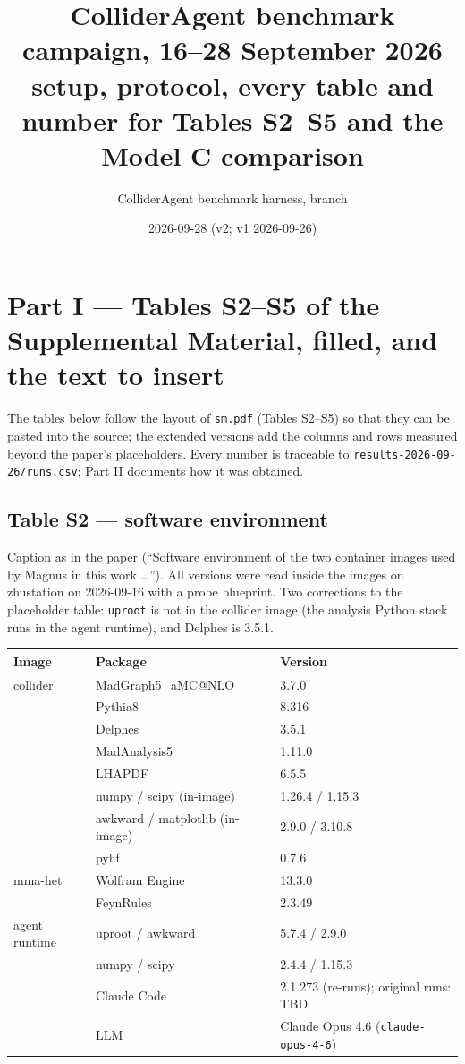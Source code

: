 \documentclass[10pt,a4paper]{article}
\title{ColliderAgent benchmark campaign, 16--28 September 2026\\\large setup, protocol, every table and number for Tables S2--S5 and the Model C comparison}
\author{ColliderAgent benchmark harness, branch \code{feat/skill-evolution-v2}}
\date{2026-09-28 (v2; v1 2026-09-26)}
\newcommand{\code}[1]{\texttt{#1}}
\begin{document}
\maketitle

\section*{Part I --- Tables S2--S5 of the Supplemental Material, filled, and the text to insert}
The tables below follow the layout of \code{sm.pdf} (Tables S2--S5) so that they can be pasted into the source; the extended
versions add the columns and rows measured beyond the paper's placeholders. Every number is traceable to
\code{results-2026-09-26/runs.csv}; Part II documents how it was obtained.

\subsection*{Table S2 --- software environment}
Caption as in the paper (``Software environment of the two container images used by Magnus in this work \ldots''). All
versions were read inside the images on zhustation on 2026-09-16 with a probe blueprint. Two corrections to the placeholder
table: \code{uproot} is not in the collider image (the analysis Python stack runs in the agent runtime), and Delphes is 3.5.1.
\begin{center}\small
\begin{tabular}{lll}
\toprule
Image & Package & Version \\
\midrule
collider & MadGraph5\_aMC@NLO & 3.7.0 \\
 & Pythia8 & 8.316 \\
 & Delphes & 3.5.1 \\
 & MadAnalysis5 & 1.11.0 \\
 & LHAPDF & 6.5.5 \\
 & numpy / scipy (in-image) & 1.26.4 / 1.15.3 \\
 & awkward / matplotlib (in-image) & 2.9.0 / 3.10.8 \\
 & pyhf & 0.7.6 \\
mma-het & Wolfram Engine & 13.3.0 \\
 & FeynRules & 2.3.49 \\
agent runtime & uproot / awkward & 5.7.4 / 2.9.0 \\
 & numpy / scipy & 2.4.4 / 1.15.3 \\
 & Claude Code & 2.1.273 (re-runs); original runs: TBD \\
 & LLM & Claude Opus 4.6 (\code{claude-opus-4-6}) \\
\bottomrule
\end{tabular}
\end{center}
\end{document}
